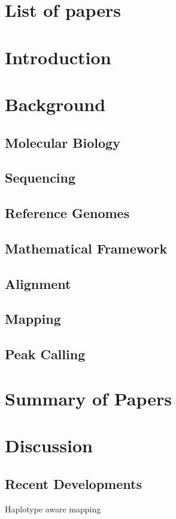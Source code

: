 \chapter{List of papers}
\chapter{Introduction}

\chapter{Background}
\section{Molecular Biology}

\section{Sequencing}

\section{Reference Genomes}

\section{Mathematical Framework}

\section{Alignment}
\label{sec:alignment}

\section{Mapping}
\label{sec:mapping}

\section{Peak Calling}
\label{sec:peakcalling}

\chapter{Summary of Papers}
\chapter{Discussion}

\section{Recent Developments}
Haplotype aware mapping

% 
% 
% 
% 
% 
% 
% 

